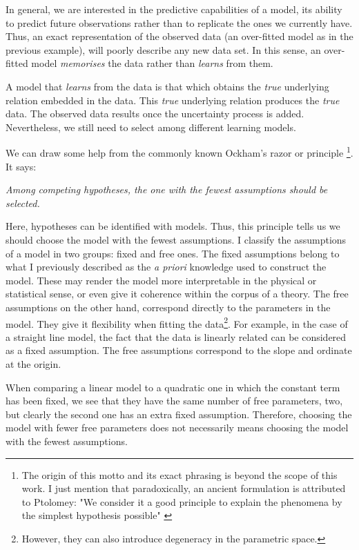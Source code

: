 In general, we are interested in the predictive capabilities of a model, its ability to predict future observations rather than to replicate the ones we currently have. Thus, an exact representation of the observed data (an over-fitted model as in the previous example), will poorly describe any new data set. In this sense, an over-fitted model \emph{memorises} the data rather than \emph{learns} from them.

A model that \emph{learns} from the data is that which obtains the \emph{true} underlying relation embedded in the data. This \emph{true} underlying relation produces the \emph{true} data. The observed data results once the uncertainty process is added. Nevertheless, we still need to select among different learning models.  

We can draw some help from the commonly known Ockham's razor or principle \footnote{The origin of this motto and its exact phrasing is beyond the scope of this work. I just mention that paradoxically, an ancient formulation is attributed to Ptolomey: "We consider it a good principle to explain the phenomena by the simplest hypothesis possible" \citep{Franklin2002}}. It says:

\textit{Among competing hypotheses, the one with the fewest assumptions should be selected.}

Here, hypotheses can be identified with models. Thus, this principle tells us we should choose the model with the fewest assumptions. I classify the assumptions of a model in two groups: fixed and free ones. The fixed assumptions belong to what I previously described as the \emph{a priori} knowledge used to construct the model. These may render the model more interpretable in the physical or statistical sense, or even give it coherence within the corpus of a theory. The free assumptions on the other hand, correspond directly to the parameters in the model. They give it flexibility when fitting the data\footnote{However, they can also introduce degeneracy in the parametric space.}. For example, in the case of a straight line model, the fact that the data is linearly related can be considered as a fixed assumption. The free assumptions correspond to the slope and ordinate at the origin. 

When comparing a linear model to a quadratic one in which the constant term has been fixed, we see that they have the same number of free parameters, two, but clearly the second one has an extra fixed assumption. Therefore, choosing the model with fewer free parameters does not necessarily means choosing the model with the fewest assumptions.

